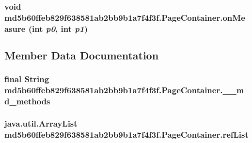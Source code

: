 \hypertarget{classmd5b60ffeb829f638581ab2bb9b1a7f4f3f_1_1_page_container_24278f432b2d8c0d9076c33f97a373e2}{
\subsubsection[{onMeasure}]{\setlength{\rightskip}{0pt plus 5cm}void md5b60ffeb829f638581ab2bb9b1a7f4f3f.PageContainer.onMeasure (int {\em p0}, \/  int {\em p1})}}
\label{classmd5b60ffeb829f638581ab2bb9b1a7f4f3f_1_1_page_container_24278f432b2d8c0d9076c33f97a373e2}




\subsection{Member Data Documentation}
\hypertarget{classmd5b60ffeb829f638581ab2bb9b1a7f4f3f_1_1_page_container_e38d550383eecfab33e3bb31102278db}{
\subsubsection[{\_\-\_\-md\_\-methods}]{\setlength{\rightskip}{0pt plus 5cm}final String {\bf md5b60ffeb829f638581ab2bb9b1a7f4f3f.PageContainer.\_\-\_\-md\_\-methods}}}
\label{classmd5b60ffeb829f638581ab2bb9b1a7f4f3f_1_1_page_container_e38d550383eecfab33e3bb31102278db}


\hypertarget{classmd5b60ffeb829f638581ab2bb9b1a7f4f3f_1_1_page_container_140eed57f6a804023f57102ca6978d13}{
\subsubsection[{refList}]{\setlength{\rightskip}{0pt plus 5cm}java.util.ArrayList {\bf md5b60ffeb829f638581ab2bb9b1a7f4f3f.PageContainer.refList}}}
\label{classmd5b60ffeb829f638581ab2bb9b1a7f4f3f_1_1_page_container_140eed57f6a804023f57102ca6978d13}




